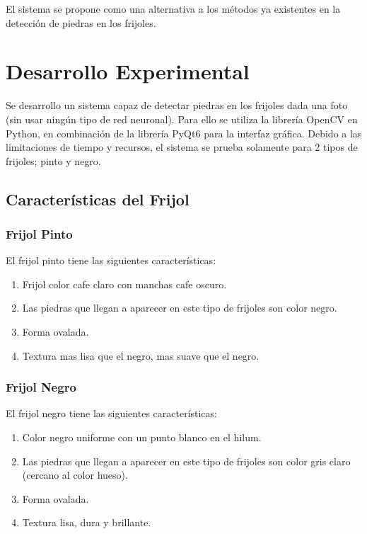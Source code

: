 \documentclass[conference]{IEEEtran}
\begin{document}
    El sistema se propone como una alternativa a los métodos ya existentes en la detección de piedras en los frijoles\cite{limpieza}.

\section{Desarrollo Experimental}
    Se desarrollo un sistema capaz de detectar piedras en los frijoles dada una foto (sin usar ningún tipo de red neuronal). Para ello se utiliza la librería OpenCV\cite{opencv} en Python\cite{python}, en combinación de la librería PyQt6\cite{pyqt6} para la interfaz gráfica.
    Debido a las limitaciones de tiempo y recursos, el sistema se prueba solamente para 2 tipos de frijoles; pinto y negro. 

    \subsection{Características del Frijol}
    \subsubsection{Frijol Pinto}
    El frijol pinto tiene las siguientes características:
    \begin{enumerate}
        \item Frijol color cafe claro con manchas cafe oscuro.
        \item Las piedras que llegan a aparecer en este tipo de frijoles son color negro.
        \item Forma ovalada.
        \item Textura mas lisa que el negro, mas suave que el negro.
    \end{enumerate}

    \subsubsection{Frijol Negro}
    El frijol negro tiene las siguientes características:
    \begin{enumerate}
        \item Color negro uniforme con un punto blanco en el hilum\cite{semillas}.
        \item Las piedras que llegan a aparecer en este tipo de frijoles son color gris claro (cercano al color hueso\cite{pantone}).
        \item Forma ovalada.
        \item Textura lisa, dura y brillante.
    \end{enumerate}
\end{document}
